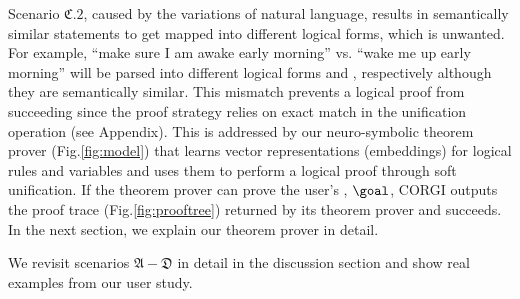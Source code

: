 Scenario $\mathfrak{C}.2$, caused by the variations of natural language, results in semantically similar statements to get mapped into different logical forms, which is unwanted. For example, ``make sure I am awake early morning'' vs. ``wake me up early morning'' will be parsed into different logical forms  and ,
respectively although they are semantically similar. This mismatch prevents a logical proof from succeeding since the proof strategy relies on exact match in the unification operation (see Appendix). This is addressed by our neuro-symbolic theorem prover (Fig.\ref{fig:model}) that learns vector representations (embeddings) for logical rules and variables and uses them to perform a logical proof through soft unification. If the theorem prover can prove the user's \textGoal, $\goal$, CORGI outputs the proof trace (Fig.\ref{fig:prooftree}) returned by its theorem prover and succeeds. In the next section, we explain our theorem prover in detail.

We revisit scenarios $\mathfrak{A}-\mathfrak{D}$ in detail in the discussion section and show real examples from our user study. 


